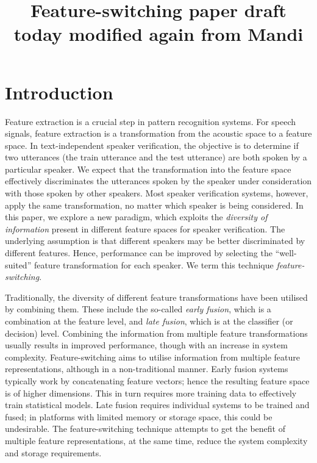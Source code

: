 \documentclass{article}
\title{Feature-switching paper draft today modified again from Mandi}
\begin{document}
\section{Introduction}
\label{sec:intro}
Feature extraction is a crucial step in pattern recognition systems. For
speech signals, feature extraction is a transformation from the acoustic space
to a feature space. In text-independent speaker verification, the objective is
to determine if two utterances (the train utterance and the test utterance) are
both spoken by a particular speaker. We expect that the transformation into the
feature space effectively discriminates the utterances spoken by the speaker
under consideration with those spoken by other speakers. Most speaker
verification systems, however, apply the same transformation, no matter which
speaker is being considered. In this paper, we explore a new paradigm, which
exploits the \emph{diversity of information} present in different feature spaces
for speaker verification. The underlying assumption is that different speakers
may be better discriminated by different features. Hence, performance can
be improved by selecting the ``well-suited'' feature transformation for
each speaker. We term this technique \emph{feature-switching}. 

Traditionally, the diversity of different feature transformations have been
utilised by combining them. These include the so-called \emph{early fusion},
which is a combination at the feature level, and \emph{late fusion}, which is at
the classifier (or decision) level. Combining the information from multiple
feature transformations usually results in improved performance, though
with an increase in system complexity. Feature-switching aims to utilise
information from multiple feature representations, although in a non-traditional
manner. Early fusion systems typically work by concatenating feature vectors;
hence the resulting feature space is of higher dimensions. This in turn requires
more training data to effectively train statistical models. Late fusion requires
individual systems to be trained and fused; in platforms with limited memory or
storage space, this could be undesirable. The feature-switching technique
attempts to get the benefit of multiple feature representations, at the same
time, reduce the system complexity and storage requirements.
\end{document}
